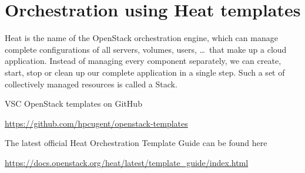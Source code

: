 \chapter{Orchestration using Heat templates}

\gls{Heat} is the name of the OpenStack orchestration engine, which can manage complete configurations of all servers, volumes, users, \ldots\  that make up a cloud application.  Instead of managing every component separately, we can create, start, stop or clean up our complete application in a single step.  Such a set of collectively managed resources is called a \gls{Stack}.

VSC OpenStack templates on GitHub

\url{https://github.com/hpcugent/openstack-templates}

The latest official \gls{Heat Orchestration Template} Guide can be found here

\url{https://docs.openstack.org/heat/latest/template_guide/index.html}

